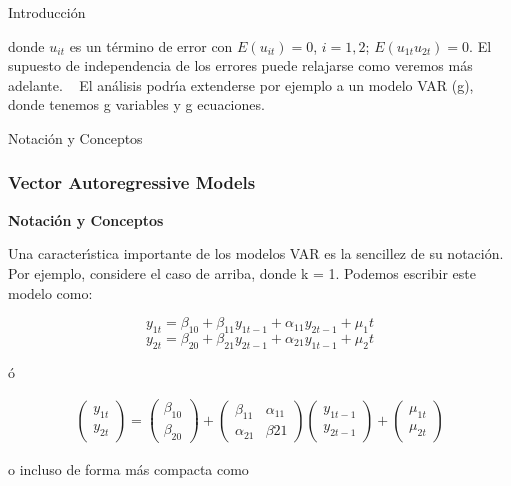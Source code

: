 \documentclass[spanish,xcolor=table]{beamer}
\begin{document}
\begin{section}{Introducci\'on}
\begin{frame}
donde $u_{it}$ es un t\'ermino de error con $E(u_{it})=0$, $i =1,2$; $E(u_{1t} u_{2t})=0$. El supuesto de independencia de los errores puede relajarse como veremos m\'as adelante.
 
El an\'alisis podr\'{\i}a extenderse por ejemplo a un modelo VAR (g), donde tenemos g variables y g ecuaciones.

\end{frame}
\end{section}
\begin{section}{Notaci\'on y Conceptos}
\begin{frame}
\frametitle{Vector Autoregressive Models}

\textbf{Notaci\'on y Conceptos}

Una caracter\'{\i}stica importante de los modelos VAR es la sencillez de su notaci\'on. Por ejemplo, considere el caso de arriba, donde k = 1. Podemos escribir este modelo como:

\begin{equation*}
y_{1t} = \beta_{10} + \beta_{11} y_{1t-1} + \alpha_{11} y_{2t-1} + \mu_1t
\end{equation*}
\begin{equation*}
y_{2t} = \beta_{20} + \beta_{21} y_{2t-1} + \alpha_{21} y_{1t-1} + \mu_2t
\end{equation*}

\'o

\begin{gather}
\begin{pmatrix} y_{1t} \\ y_{2t} \end{pmatrix}
 =
\begin{pmatrix} \beta_{10} \\ \beta_{20} \end{pmatrix}
+
\begin{pmatrix} \beta_{11} & \alpha_{11} \\ \alpha_{21} & \beta{21} \end{pmatrix}
\begin{pmatrix} y_{1t-1} \\ y_{2t-1} \end{pmatrix}
+
\begin{pmatrix} \mu_{1t} \\ \mu_{2t} \end{pmatrix}
\end{gather}

o incluso de forma m\'as compacta como


\end{frame}
\end{section}
\end{document}
